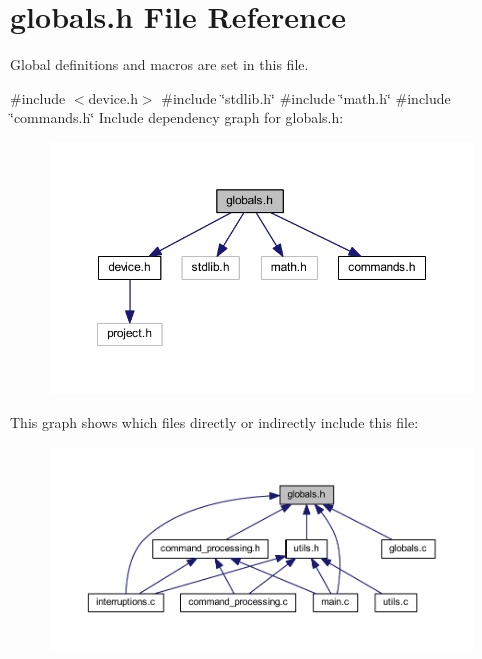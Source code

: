 \section{globals.\+h File Reference}
\label{globals_8h}


Global definitions and macros are set in this file.  


{\ttfamily \#include $<$device.\+h$>$}\newline
{\ttfamily \#include \char`\"{}stdlib.\+h\char`\"{}}\newline
{\ttfamily \#include \char`\"{}math.\+h\char`\"{}}\newline
{\ttfamily \#include \char`\"{}commands.\+h\char`\"{}}\newline
Include dependency graph for globals.\+h\+:
\nopagebreak
\begin{figure}[H]
\begin{center}
\leavevmode
\includegraphics[width=350pt]{globals_8h__incl}
\end{center}
\end{figure}
This graph shows which files directly or indirectly include this file\+:
\nopagebreak
\begin{figure}[H]
\begin{center}
\leavevmode
\includegraphics[width=350pt]{globals_8h__dep__incl}
\end{center}
\end{figure}
